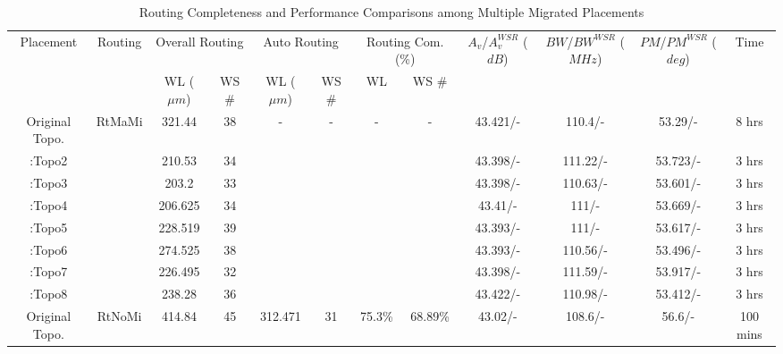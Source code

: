     \begin{table}
      \scriptsize
      \begin{center}
        \caption{Routing Completeness and Performance Comparisons among Multiple Migrated Placements}\label{table:MultProto}
        \begin{tabular}{|c|c|c|c|c|c|c|c|c|c|c|c|}
          \toprule
          \hline
          \multirow{2}{*}{Placement}& 
          \multirow{2}{*}{Routing} & 
          \multicolumn{2}{c|}{Overall Routing}  & 
          \multicolumn{2}{c|}{Auto Routing } & 
          \multicolumn{2}{c|}{Routing Com. (\%)} & 
          \multirow{2}{1cm}{\scriptsize $A_v$/$A_v^{WSR}$ ($dB$)} & 
          \multirow{2}{1.3cm}{\tiny $BW$/$BW^{WSR}$ ($MHz$)} & 
          \multirow{2}{1.3cm}{\tiny $PM$/$PM^{WSR}$ ($deg$)} & 
          \multirow{2}{*}{Time}\\
          \cline{3-8} 
          & & WL ($\mu m$) & WS \#  &  WL ($\mu m$) & WS \# &  WL & WS \# & & & & \\
          \hline
            Original Topo. & \multirow{8}{*}{RtMaMi} & 321.44 & 38 &\multirow{8}{*}{-} & \multirow{8}{*}{-} & \multirow{8}{*}{-} & \multirow{8}{*}{-} & 43.421/- & 110.4/- & 53.29/- & 8 hrs \\ \cline{1-1} \cline{3-4} \cline{9-12}
            \cite{ALP_YPWeng_iccad2011}:Topo2 & & 210.53 & 34 & & & & & 43.398/- & 111.22/- & 53.723/- & 3 hrs \\ 
            \cite{ALP_YPWeng_iccad2011}:Topo3 & & 203.2 & 33 & & & & & 43.398/- & 110.63/- & 53.601/- & 3 hrs \\ 
            \cite{ALP_YPWeng_iccad2011}:Topo4 & & 206.625 & 34 & & & & & 43.41/- & 111/- & 53.669/- & 3 hrs \\ 
            \cite{ALP_YPWeng_iccad2011}:Topo5 & & 228.519 & 39 & & & & & 43.393/- & 111/- & 53.617/- & 3 hrs \\ 
            \cite{ALP_YPWeng_iccad2011}:Topo6 & & 274.525 & 38 & & & & & 43.393/- & 110.56/- & 53.496/- & 3 hrs \\ 
            \cite{ALP_YPWeng_iccad2011}:Topo7 & & 226.495 & 32 & & & & & 43.398/- & 111.59/- & 53.917/- & 3 hrs \\ 
            \cite{ALP_YPWeng_iccad2011}:Topo8 & & 238.28 & 36 & & & & & 43.422/- & 110.98/- & 53.412/- & 3 hrs \\
          \hline
            Original Topo. & \multirow{8}{*}{RtNoMi} & 414.84 & 45 & 312.471 & 31 & 75.3\% & 68.89\% & 43.02/- & 108.6/- & 56.6/- & 100 mins \\ \cline{1-1} \cline{3-12}

\end{tabular}
\end{center}
\end{table}
